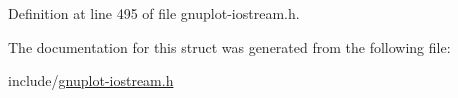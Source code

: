 Definition at line 495 of file gnuplot-\/iostream.\+h.



The documentation for this struct was generated from the following file\+:\begin{DoxyCompactItemize}
\item 
include/\hyperlink{gnuplot-iostream_8h}{gnuplot-\/iostream.\+h}\end{DoxyCompactItemize}
